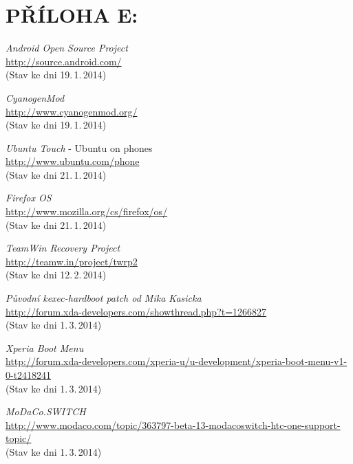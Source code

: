 \documentclass[12pt, a4paper, oneside]{article}
\newcommand{\It}{\textit}  %
\begin{document}
 \section*{PŘÍLOHA E:}
 \begin{thebibliography}{99}

     \It{Android Open Source Project} \\
    \url{http://source.android.com/}\\
    (Stav ke dni 19.\,1.\,2014)

     \It{CyanogenMod} \\
    \url{http://www.cyanogenmod.org/}\\
    (Stav ke dni 19.\,1.\,2014)

     \It{Ubuntu Touch} - Ubuntu on phones \\
    \url{http://www.ubuntu.com/phone}\\
    (Stav ke dni 21.\,1.\,2014)

     \It{Firefox OS}\\
    \url{http://www.mozilla.org/cs/firefox/os/}\\
    (Stav ke dni 21.\,1.\,2014)

     \It{TeamWin Recovery Project}\\
    \url{http://teamw.in/project/twrp2}\\
    (Stav ke dni 12.\,2.\,2014)

     \It{Původní kexec-hardboot patch od Mika Kasicka}\\
    \url{http://forum.xda-developers.com/showthread.php?t=1266827}\\
    (Stav ke dni 1.\,3.\,2014)

     \It{Xperia Boot Menu}\\
    \url{http://forum.xda-developers.com/xperia-u/u-development/xperia-boot-menu-v1-0-t2418241}\\
    (Stav ke dni 1.\,3.\,2014)

     \It{MoDaCo.SWITCH}\\
    \url{http://www.modaco.com/topic/363797-beta-13-modacoswitch-htc-one-support-topic/}\\
    (Stav ke dni 1.\,3.\,2014)


\end{thebibliography}
\end{document}
